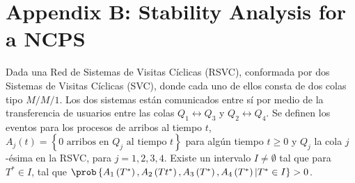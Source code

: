 \section{Appendix B: Stability Analysis for a NCPS}
%
\begin{Teo}
Dada una Red de Sistemas de Visitas C\'iclicas (RSVC), conformada por dos Sistemas de Visitas C\'iclicas (SVC), donde cada uno de ellos consta de dos colas tipo $M/M/1$. Los dos sistemas est\'an comunicados entre s\'i por medio de la transferencia de usuarios entre las colas $Q_{1}\leftrightarrow Q_{3}$ y $Q_{2}\leftrightarrow Q_{4}$. Se definen los eventos para los procesos de arribos al tiempo $t$, $A_{j}\left(t\right)=\left\{0 \textrm{ arribos en }Q_{j}\textrm{ al tiempo }t\right\}$ para alg\'un tiempo $t\geq0$ y $Q_{j}$ la cola $j$-\'esima en la RSVC, para $j=1,2,3,4$.  Existe un intervalo $I\neq\emptyset$ tal que para $T^{*}\in I$, tal que $\prob\left\{A_{1}\left(T^{*}\right),A_{2}\left(Tt^{*}\right),
A_{3}\left(T^{*}\right),A_{4}\left(T^{*}\right)|T^{*}\in I\right\}>0$.
\end{Teo}



